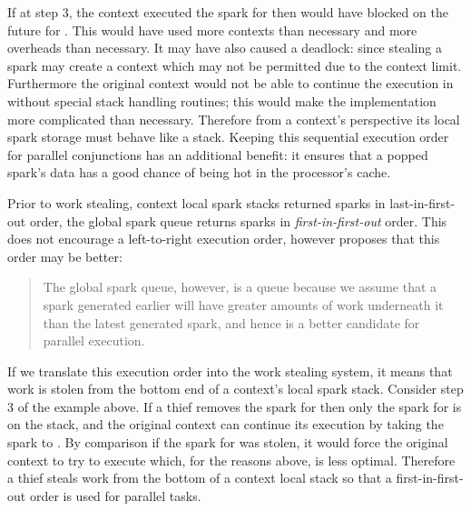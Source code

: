 If at step 3,
the context executed the spark for  then
 would have blocked on the future for .
This would have used more contexts than necessary and more overheads than
necessary.
It may have also caused a deadlock:
since stealing a spark may create a context which may not be permitted due
to the context limit.
Furthermore
the original context would not be able to continue the execution in 
without special stack handling routines;
this would make the implementation more complicated than necessary.
Therefore from a context's perspective its local spark storage must behave
like a stack.
Keeping this sequential execution order for parallel conjunctions has
an additional benefit:
it ensures that a popped spark's data has a good chance of being hot in the
processor's cache.

Prior to work stealing,
context local spark stacks returned sparks in last-in-first-out
order,
the global spark queue returns sparks in \emph{first-in-first-out} order.
This does not encourage a left-to-right execution order,
however \citet{wang:2006:hons} proposes that this order may be better:

\begin{quote}
The global spark queue, however, is a queue because we assume that a
spark generated earlier will have greater amounts of work underneath it
than the latest generated spark, and hence is a better candidate for
parallel execution.
\end{quote}

\noindent
If we translate this execution order into the work stealing system,
it means that work is stolen from the bottom end of a context's local spark
stack.
Consider step 3 of the example above.
If a thief removes the spark for 
then only the spark for  is on the stack, and
the original context can continue its execution by taking the spark to
.
By comparison if the spark for  was stolen,
it would force the original context to try to execute 
which, for the reasons above, is less optimal.
Therefore a thief steals work from the bottom of a context local stack
so that a first-in-first-out order is used for parallel tasks.

